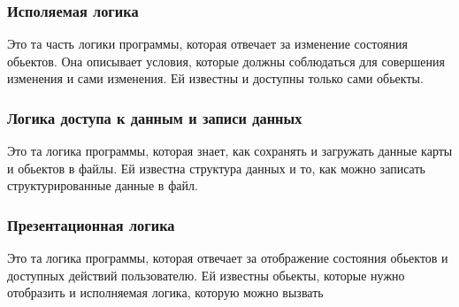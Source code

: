 \documentclass[a4paper,14pt]{extarticle}
\begin{document}
\subsubsection{Исполяемая логика}
Это та часть логики программы, которая отвечает за изменение состояния обьектов. Она описывает условия, которые должны соблюдаться для совершения изменения и сами изменения. Ей известны и доступны только сами обьекты.

\subsubsection{Логика доступа к данным и записи данных}
Это та логика программы, которая знает, как сохранять и загружать данные карты и обьектов в файлы. Ей известна структура данных и то, как можно записать структурированные данные в файл.

\subsubsection{Презентационная логика}
Это та логика программы, которая отвечает за отображение состояния обьектов и доступных действий пользователю. Ей известны обьекты, которые нужно отобразить и исполняемая логика, которую можно вызвать
\end{document}
